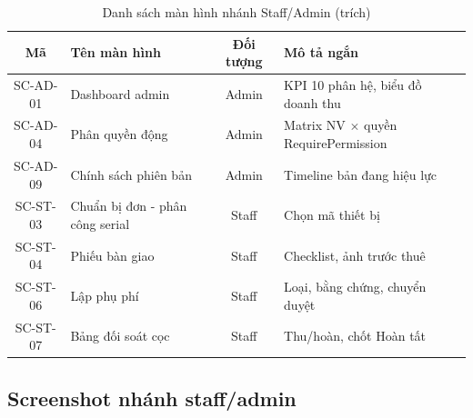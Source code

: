 \begin{table}[H]
\centering
\caption{Danh sách màn hình nhánh Staff/Admin (trích)}
\label{tab:screens_admin}
\begin{tabularx}{\textwidth}{|c|l|c|X|}
\hline
\textbf{Mã} & \textbf{Tên màn hình} & \textbf{Đối tượng} & \textbf{Mô tả ngắn} \\ \hline
SC-AD-01 & Dashboard admin             & Admin  & KPI 10 phân hệ, biểu đồ doanh thu \\ \hline
SC-AD-04 & Phân quyền động             & Admin  & Matrix NV $\times$ quyền RequirePermission \\ \hline
SC-AD-09 & Chính sách phiên bản        & Admin  & Timeline bản đang hiệu lực \\ \hline
SC-ST-03 & Chuẩn bị đơn - phân công serial & Staff & Chọn mã thiết bị \\ \hline
SC-ST-04 & Phiếu bàn giao              & Staff  & Checklist, ảnh trước thuê \\ \hline
SC-ST-06 & Lập phụ phí                 & Staff  & Loại, bằng chứng, chuyển duyệt \\ \hline
SC-ST-07 & Bảng đối soát cọc           & Staff  & Thu/hoàn, chốt Hoàn tất \\ \hline
\end{tabularx}
\end{table}

\subsection{Screenshot nhánh staff/admin}
